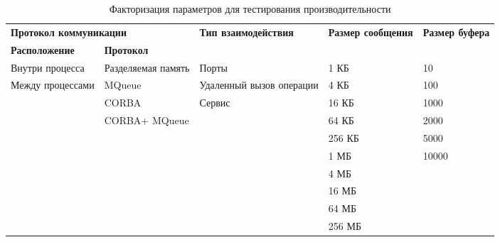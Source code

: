 \begin{table}[]
	\centering
	\caption{Факторизация параметров для тестирования производительности \toolchain}
	\label{table:chapter2:orocos_test_cases}
	\def\arraystretch{1.3}
		\begin{tabular}{|p{3.2cm}|p{2.6cm}|p{3.6cm}|p{2.5cm}|p{1.6cm}|}
			\hline
			\multicolumn{2}{|l|}{\textbf{Протокол коммуникации}} & \multirow{2}{3.6cm}{\textbf{Тип взаимодействия}} & \multirow{2}{2.5cm}{\textbf{Размер сообщения}} & \multirow{2}{1.6cm}{\textbf{Размер буфера}} \\ \cline{1-2}
			\textbf{Расположение} & \textbf{Протокол} &  &  &  \\ \hline
			Внутри процесса       & Разделяемая память & Порты                    & 1 КБ   & 10    \\ \hline
			Между процессами      & MQueue             & Удаленный вызов операции & 4 КБ   & 100   \\ \hline
			\multirow{2}{*}{}     & CORBA              & Сервис                   & 16 КБ  & 1000  \\ \cline{2-5} 
			                      & CORBA+ MQueue      & \multirow{7}{*}{}        & 64 КБ  & 2000  \\ \cline{1-2} \cline{4-5} 
			\multicolumn{2}{|l|}{\multirow{6}{*}{}}    &                          & 256 КБ & 5000  \\ \cline{4-5} 
			\multicolumn{2}{|l|}{}                     &                          & 1 МБ   & 10000 \\ \cline{4-5} 
			\multicolumn{2}{|l|}{}                     &                          & 4 МБ   & \multirow{4}{*}{} \\ \cline{4-4}
			\multicolumn{2}{|l|}{}                     &                          & 16 МБ  &       \\ \cline{4-4}
			\multicolumn{2}{|l|}{}                     &                          & 64 МБ  &       \\ \cline{4-4}
			\multicolumn{2}{|l|}{}                     &                          & 256 МБ &       \\ \hline
		\end{tabular}%
	
\end{table}